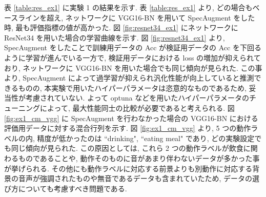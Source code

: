 \documentclass[twocolumn]{jarticle}     %
\begin{document}
表 \ref{table:res_ex1} に実験 1 の結果を示す. 表 \ref{table:res_ex1} より, どの場合もベースラインを超え, ネットワークに VGG16-BN を用いて SpecAugment をした時, 最も評価指標の値が高かった. 図 \ref{fig:resnet34_ex1} にネットワークに ResNet34 を用いた場合の学習曲線を示す. 図 \ref{fig:resnet34_ex1} より, SpecAugment をしたことで訓練用データの Acc が検証用データの Acc を下回るように学習が進んでいる一方で, 検証用データにおける loss の増加が抑えられており, ネットワークに VGG16-BN を用いた場合でも同じ傾向が見られた. この事より, SpecAugment によって過学習が抑えられ汎化性能が向上していると推測できるものの, 本実験で用いたハイパーパラメータは恣意的なものであるため, 妥当性が考慮されていない. よって optuna などを用いたハイパーパラメータのチューニングによって, 最大性能同士の比較が必要であると考えられる. 図 \ref{fig:ex1_cm_vgg} に SpecAugment を行わなかった場合の VGG16-BN における評価用データに対する混合行列を示す. 図 \ref{fig:ex1_cm_vgg} より, 5 つの動作ラベルの内, 精度が低かったのは ``drinking", ``eating meal" であり, どの実験設定でも同じ傾向が見られた. この原因としては, これら 2 つの動作ラベルが飲食に関わるものであることや, 動作そのものに音があまり伴わないデータが多かった事が挙げられる. その他にも動作ラベルに対応する前景よりも別動作に対応する背景の音声が強調されたものや無音であるデータも含まれていたため, データの選び方についても考慮すべき問題である.

\captionsetup[table]{font=footnotesize}
\captionsetup[table]{labelfont=footnotesize}
\end{document}
